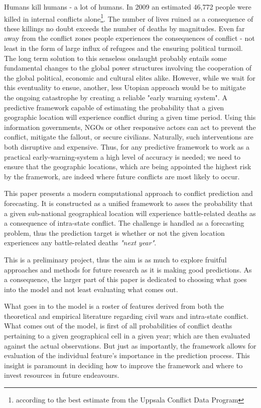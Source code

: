 \documentclass[a4paper]{article}
\begin{document}
Humans kill humans - a lot of humans. In 2009 an estimated 46,772 people were killed in internal conflicts alone\footnote{according to the best estimate from the Uppsala Conflict Data Program}. The number of lives ruined as a consequence of these killings no doubt exceeds the number of deaths by magnitudes. Even far away from the conflict zones people experiences the consequences of conflict - not least in the form of large influx of refugees and the ensuring political turmoil. The long term solution to this senseless onslaught probably entails some fundamental changes to the global power structures involving the cooperation of the global political, economic and cultural elites alike. However, while we wait for this eventuality to ensue, another, less Utopian approach would be to mitigate the ongoing catastrophe by creating a reliable "early warning system". A predictive framework capable of estimating the probability that a given geographic location will experience conflict during a given time period. Using this information governments, NGOs or other responsive actors can act to prevent the conflict, mitigate the fallout, or secure civilians. Naturally, such interventions are both disruptive and expensive. Thus, for any predictive framework to work as a practical early-warning-system a high level of accuracy is needed; we need to ensure that the geographic locations, which are being appointed the highest risk by the framework, are indeed where future conflicts are most likely to occur.\par

This paper presents a modern computational approach to conflict prediction and forecasting. It is constructed as a unified framework to asses the probability that a given sub-national geographical location will experience battle-related deaths as a consequence of intra-state conflict. The challenge is handled as a forecasting problem, thus the prediction target is whether or not the given location experiences any battle-related deaths \emph{"next year"}.\par 

This is a preliminary project, thus the aim is as much to explore fruitful approaches and methods for future research as it is making good predictions. As a consequence, the larger part of this paper is dedicated to choosing what goes into the model and not least evaluating what comes out.\par

What goes in to the model is a roster of features derived from both the theoretical and empirical literature regarding civil wars and intra-state conflict. What comes out of the model, is first of all probabilities of conflict deaths pertaining to a given geographical cell in a given year; which are then evaluated against the actual observations. But just as importantly, the framework allows for evaluation of the individual feature's importance in the prediction process. This insight is paramount in deciding how to improve the framework and where to invest resources in future endeavours.\par
\end{document}
